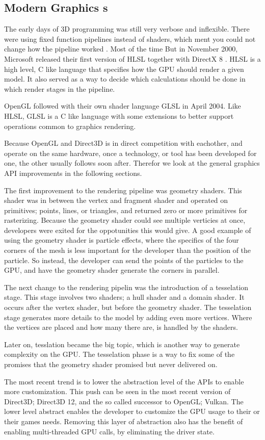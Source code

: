 \subsection{Modern Graphics s}

The early days of 3D programming was still very verbose and inflexible. 
There were using fixed function pipelines instead of shaders, which ment you could not change how the pipeline worked \cite{davidovic2014fixedfunction}.
Most of the time 
But in November 2000, Microsoft released their first version of \gls{HLSL} together with DirectX 8 \cite{wikipedia????directx}.
\Gls{HLSL} is a high level, C like language that specifies how the \gls{GPU} should render a given model.
It also served as a way to decide which calculations should be done in which render stages in the pipeline.

OpenGL followed with their own shader language \gls{GLSL} in April 2004.
Like \gls{HLSL}, \gls{GLSL} is a C like language with some extensions to better support operations common to graphics rendering.

Because OpenGL and Direct3D is in direct competition with eachother, and operate on the same hardware, once a technology, or tool has been developed for one, the other usually follows soon after.
Therefor we look at the general graphics \gls{API} improvements in the following sections.

The first improvement to the rendering pipeline was geometry shaders.
This shader was in between the vertex and fragment shader and operated on primitives; points, lines, or triangles, and returned zero or more primitives for rasterizing.
Because the geometry shader could see multiple verticies at once, developers were exited for the oppotunities this would give.
A good example of using the geometry shader is particle effects, where the specifics of the four corners of the mesh is less important for the developer than the position of the particle.
So instead, the developer can send the points of the particles to the \gls{GPU}, and have the geometry shader generate the corners in parallel.

The next change to the rendering pipelin was the introduction of a tesselation stage.
This stage involves two shaders; a hull shader and a domain shader.
It occurs after the vertex shader, but before the geometry shader.
The tesselation stage generates more details to the model by adding even more vertices.
Where the vertices are placed and how many there are, is handled by the shaders.

Later on, tesslation became the big topic, which is another way to generate complexity on the \gls{GPU}.
The tesselation phase is a way to fix some of the promises that the geometry shader promised but never delivered on.

The most recent trend is to lower the abstraction level of the \glspl{API} to enable more customization.
This push can be seen in the most recent version of Direct3D; Direct3D 12, and the so called successor to OpenGL; Vulkan.
The lower level abstract enables the developer to customize the \gls{GPU} usage to their or their games needs.
Removing this layer of abstraction also has the benefit of enabling multi-threaded \gls{GPU} calls, by eliminating the driver state.
